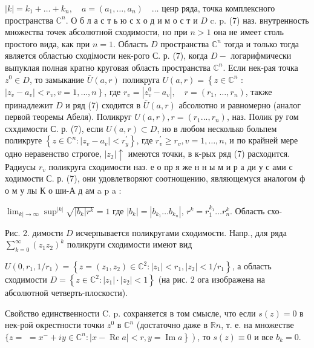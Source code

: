 \documentclass[10pt]{article}
\begin{document}
$|k|=k_{1}+\ldots+k_{n}, \quad a=\left(a_{1}, \ldots, a_{n}\right) \quad \ldots$ ценр ряда, точка комплексного пространства $\mathbb{C}^{n}$. О б л а с т ь ю с х о д и м о с т и $D$ c. p. (7) наз. внутренность множества точек абсолютной сходимости, но при $n>1$ она не имеет столь простого вида, как при $n=1$. Область $D$ пространства $\mathbb{C}^{n}$ тогда и только тогда является областью сходімости нек-рого С. р. (7), когда $D-$ логарифмически выпуклая полная кратно круговая область пространства $\mathbb{C}^{n}$. Если нек-рая точка $z^{0} \in D$, то замыкание $\bar{U}(a, r)$ поликруга $U(a, r)=\left\{z \in \mathbb{C}^{n}\right.$ : $\left.\left|z_{v}-a_{v}\right|<r_{v}, v=1, \ldots, n\right\}$, где $r_{v}=\left|z_{v}^{0}-a_{v}\right|, \quad r=\left(r_{1}\right.$, $\left.\ldots, r_{n}\right)$, также принадлежит $D$ и ряд (7) сходится в $\bar{U}(a, r)$ абсолютно и равномерно (аналог первой теоремы Абеля). Поликруг $U(a, r), r=\left(r_{1} . . ., r_{n}\right)$, наз. Полик ру гом сххдимости С. р. (7), если $U(a, r) \subset D$, но в любом несколько больпем поликруге $\left\{z \in \mathbb{C}^{n}:\left|z_{v}-a_{v}\right|<r_{y}^{\prime}\right\}$, где $r_{v}^{\prime} \geqslant r_{v}, v=1, \ldots, n$, и по крайней мере одно неравенство строгое, $\left|z_{2}\right| \uparrow$ имеются точки, в к-рых ряд (7) расходится. Радиусы $r_{v}$ поликруга сходимости наз. е о пр я же н н ы м и р а ди у с ами с ходимости С. р. (7), они удовлетворяют соотнощению, являющемуся аналогом ф о м у лы К о ши-А д ам a p a :



$\lim _{k \mid \rightarrow \infty} \sup ^{|k|} \sqrt{\left|b_{k}\right| r^{k}}=1$ где $\left|b_{k}\right|=\left|b_{k_{1}} \ldots b_{k_{n}}\right|$, $r^{k}=r_{1}^{k_{1}} \ldots r_{n}^{k}$. Область схо-



Рис. 2. димости $D$ исчерпывается поликругами сходимости. Напр., для ряда $\sum_{k=0}^{\infty}\left(z_{1} z_{2}\right)^{k}$ поликруги сходимости имеют вид



$U\left(0, r_{1}, 1 / r_{1}\right)=\left\{z=\left(z_{1}, z_{2}\right) \in \mathbb{C}^{2}:\left|z_{1}\right|<r_{1},\left|z_{2}\right|<1 / r_{1}\right\}$, а область сходимости $D=\left\{z \in \mathbb{C}^{2}:\left|z_{1}\right| \cdot\left|z_{2}\right|<1\right\}$ (на рис. 2 ога изображена на абсолютной четверть-плоскости).



Свойство единственности $\mathrm{C}$. p. сохраняется в том смысле, что если $s(z)=0$ в нек-рой окрестности точки $z^{0}$ в $\mathbb{C}^{n}$ (достаточно даже в $\mathbb{R} n$, т. е. на множестве $\{z=$ $\left.\left.=x^{-}+i y \in \mathbb{C}^{n}:|x-\operatorname{Re} a|<r, y=\operatorname{Im} a\right\}\right)$, то $s(z) \equiv 0$ и все $b_{k}=0$.
\end{document}
